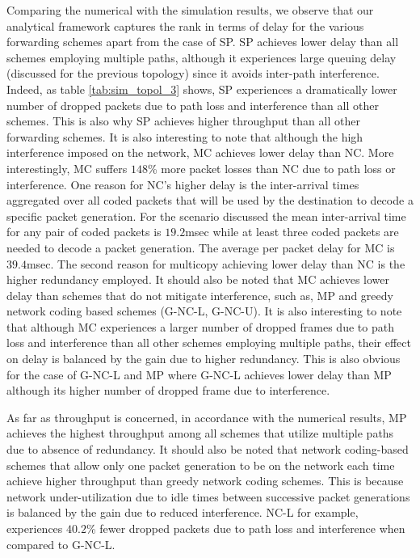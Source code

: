 \documentclass[journal, onecolumn, 12pt]{IEEEtran}
\begin{document}
Comparing the numerical with the simulation results, we observe that our analytical framework captures the rank in terms of delay for the various forwarding schemes apart from the case of SP.
SP achieves lower delay than all schemes employing multiple paths, although it experiences large queuing delay (discussed for the previous topology) since it avoids inter-path interference.
Indeed, as table \ref{tab:sim_topol_3} shows, SP experiences a dramatically lower number of dropped packets due to path loss and interference than all other schemes.
This is also why SP achieves higher throughput than all other forwarding schemes.
It is also interesting to note that although the high interference imposed on the network, MC achieves lower delay than NC.
More interestingly, MC suffers $148$\% more packet losses than NC due to path loss or interference.
One reason for NC's higher delay is the inter-arrival times aggregated over all coded packets that will be used by the destination to decode a specific packet generation.
For the scenario discussed the mean inter-arrival time for any pair of coded packets is $19.2$msec while at least three coded packets are needed to decode a packet generation.
The average per packet delay for MC is $39.4$msec.
The second reason for multicopy achieving lower delay than NC is the higher redundancy employed.
It should also be noted that MC achieves lower delay than schemes that do not mitigate interference, such as, MP and greedy network coding based schemes (G-NC-L, G-NC-U).
It is also interesting to note that although MC experiences a larger number of dropped frames due to path loss and interference than all other schemes employing multiple paths,
their effect on delay is balanced by the gain due to higher redundancy.
This is also obvious for the case of G-NC-L and MP where G-NC-L achieves lower delay than MP although its higher number of dropped frame due to interference.

As far as throughput is concerned, in accordance with the numerical results, MP achieves the highest throughput among all schemes that utilize multiple paths due to absence of redundancy.
It should also be noted that network coding-based schemes that allow only one packet generation to be on the network each time achieve higher throughput than greedy network coding schemes.
This is because network under-utilization due to idle times between successive packet generations is balanced by the gain due to reduced interference.
NC-L for example, experiences $40.2$\% fewer dropped packets due to path loss and interference when compared to G-NC-L.
\end{document}
